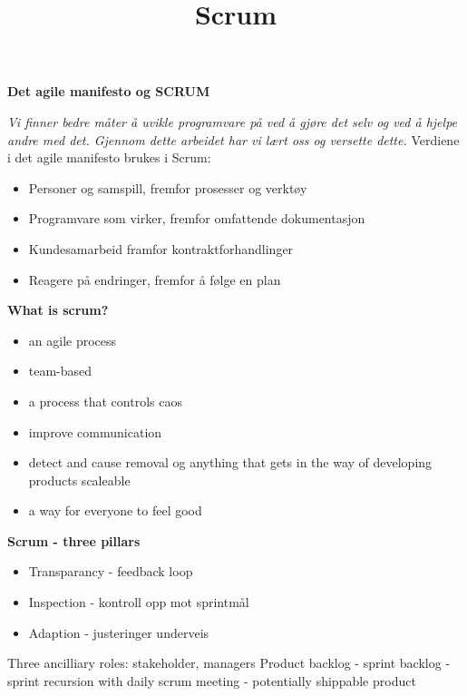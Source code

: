 \documentclass{article}
\title{Scrum}
\begin{document}
\begin{flushleft}
    
    \textbf{\large Det agile manifesto og SCRUM}\par 

    \emph{Vi finner bedre måter å uvikle programvare på ved å gjøre det selv og ved å hjelpe andre med det. Gjennom dette arbeidet har vi lært oss og versette dette.}
    Verdiene i det agile manifesto brukes i Scrum:
    \begin{itemize}
        \item Personer og samspill, fremfor prosesser og verktøy
        \item Programvare som virker, fremfor omfattende dokumentasjon
        \item Kundesamarbeid framfor kontraktforhandlinger
        \item Reagere på endringer, fremfor å følge en plan
    \end{itemize}

    \dotfill

    \textbf{What is scrum?}\par 
    \begin{itemize}
        \item an agile process
        \item team-based
        \item a process that controls caos
        \item improve communication
        \item detect and cause removal og anything that gets in the way of developing products scaleable
        \item a way for everyone to feel good
    \end{itemize}

    \textbf{Scrum - three pillars}\par 
    \begin{itemize}
        \item Transparancy - feedback loop
        \item Inspection - kontroll opp mot sprintmål
        \item Adaption - justeringer underveis
    \end{itemize}
    Three ancilliary roles: stakeholder, managers
    Product backlog - sprint backlog - sprint recursion with daily scrum meeting - potentially shippable product 
    
    \bigskip


\end{flushleft}
\end{document}
